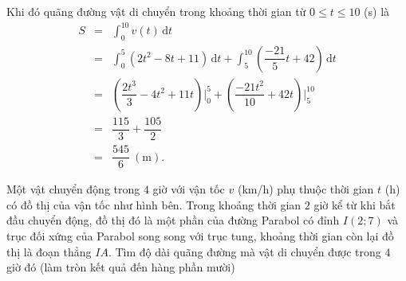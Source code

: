 \begin{bt}
{		Khi đó  quãng đường vật di chuyển trong khoảng thời gian từ $0\leq t\leq 10$ (s) là
		\allowdisplaybreaks\begin{eqnarray*}
		S&=&\int_0^{10}v(t)\mathrm{\,d}t\\ 
		 &=&\int_0^5\left(2t^2-8t+11\right)\mathrm{\,d}t+\int_5^{10}\left(\dfrac{-21}{5}t+42\right)\mathrm{\,d}t\\
		 &=&\left(\dfrac{2t^3}{3}-4t^2+11t\right)\bigg|_0^5+\left(\dfrac{-21t^2}{10}+42t\right)\bigg|_5^{10}\\
		&=&\dfrac{115}{3}+\dfrac{105}{2}\\ 
		&=&\dfrac{545}{6}\  (\mathrm{m}).
	\end{eqnarray*}
} 
\end{bt}

\begin{bt}%
\immini
{
Một vật chuyển động trong $4$ giờ với vận tốc $v$ (km/h) phụ thuộc thời gian $t$ (h) có đồ thị của vận tốc như hình bên. Trong khoảng thời gian $2$ giờ kể từ khi bắt đầu chuyển động, đồ thị đó là một phần của đường Parabol có đỉnh $I(2;7)$ và trục đối xứng của Parabol song song với trục tung, khoảng thời gian còn lại đồ thị là đoạn thẳng $IA$. Tìm độ dài quãng đường mà vật di chuyển được trong $4$ giờ đó (làm tròn kết quả đến hàng phần mười)	
}
{
}	
\end{bt}
